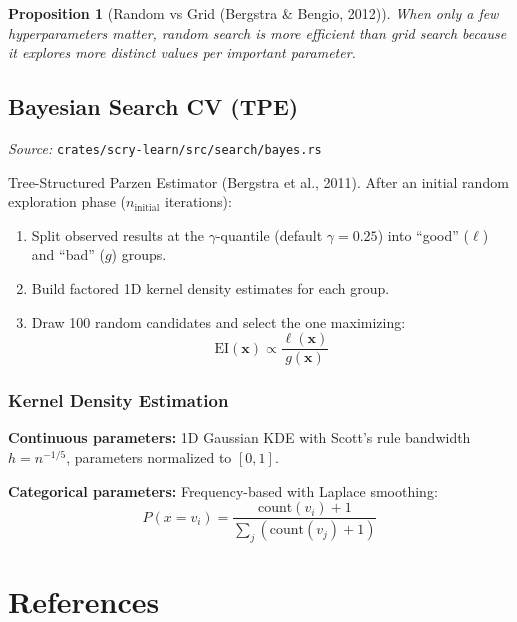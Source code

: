 \documentclass[11pt,a4paper]{article}
\newtheorem{proposition}[theorem]{Proposition}
\theoremstyle{definition}
\theoremstyle{remark}
\begin{document}
\begin{proposition}[Random vs Grid (Bergstra \& Bengio, 2012)]
When only a few hyperparameters matter, random search is more efficient than grid search because it explores more distinct values per important parameter.
\end{proposition}

\subsection{Bayesian Search CV (TPE)}

\noindent\textit{Source:} \texttt{crates/scry-learn/src/search/bayes.rs}

Tree-Structured Parzen Estimator (Bergstra et al., 2011). After an initial random exploration phase ($n_{\text{initial}}$ iterations):

\begin{enumerate}[label=\arabic*., itemsep=0pt]
\item Split observed results at the $\gamma$-quantile (default $\gamma = 0.25$) into ``good'' ($\ell$) and ``bad'' ($g$) groups.
\item Build factored 1D kernel density estimates for each group.
\item Draw 100 random candidates and select the one maximizing:
\begin{equation}
\text{EI}(\mathbf{x}) \propto \frac{\ell(\mathbf{x})}{g(\mathbf{x})}
\end{equation}
\end{enumerate}

\subsubsection*{Kernel Density Estimation}

\textbf{Continuous parameters:} 1D Gaussian KDE with Scott's rule bandwidth $h = n^{-1/5}$, parameters normalized to $[0,1]$.

\textbf{Categorical parameters:} Frequency-based with Laplace smoothing:
\begin{equation}
P(x = v_i) = \frac{\text{count}(v_i) + 1}{\sum_j(\text{count}(v_j) + 1)}
\end{equation}


\section*{References}
\end{document}
